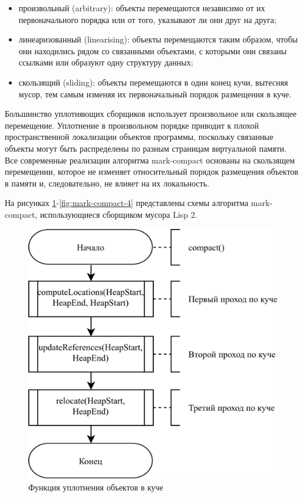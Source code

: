 \begin{itemize}[label*=---]
	\item произвольный (arbitrary): объекты перемещаются независимо от их первоначального порядка или от того, указывают ли они друг на друга;
	\item линеаризованный (linearising): объекты перемещаются таким образом, чтобы они находились рядом со связанными объектами, с которыми они связаны ссылками или образуют одну структуру данных;
	\item скользящий (sliding): объекты перемещаются в один конец кучи, вытесняя мусор, тем самым изменяя их первоначальный порядок размещения в куче.
\end{itemize}

Большинство уплотняющих сборщиков использует произвольное или скользящее перемещение. Уплотнение в произвольном порядке приводит к плохой пространственной локализации объектов программы, поскольку связанные объекты могут быть распределены по разным страницам виртуальной памяти. Все современные реализации алгоритма mark-compact основаны на скользящем перемещении, которое не изменяет относительный порядок размещения объектов в памяти и, следовательно, не влияет на их локальность. \cite{handbook}

На рисунках \ref{fig:mark-compact-1}-\ref{fig:mark-compact-4} представлены схемы алгоритма mark-compact, использующиеся сборщиком мусора Lisp 2. \cite{handbook}

\begin{figure}[H]
	\centering
	\includegraphics[scale=0.175]{assets/mark-compact-1.png}
	\caption{Функция уплотнения объектов в куче}
	\label{fig:mark-compact-1}
\end{figure}

